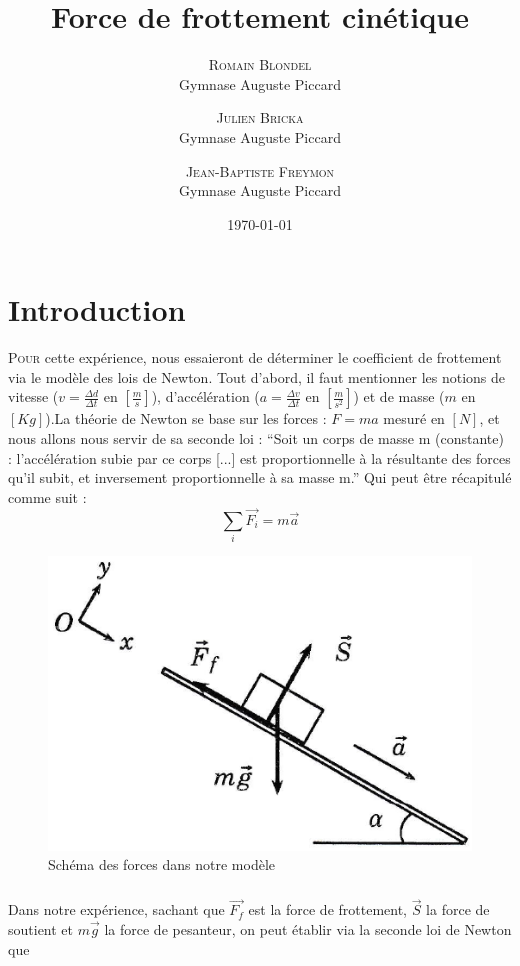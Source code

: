 \documentclass[twoside,twocolumn]{article}
\title{Force de frottement cinétique} %
\author{%
\textsc{Romain Blondel} \\[1ex] %
\normalsize Gymnase Auguste Piccard \\
\and %
\textsc{Julien Bricka} \\[1ex]
\normalsize Gymnase Auguste Piccard \\ %
\and %
\textsc{Jean-Baptiste Freymon} \\[1ex] %
\normalsize Gymnase Auguste Piccard \\ %
}
\date{\today} %
\begin{document}
\maketitle


\section{Introduction}
\lettrine[nindent=0em,lines=3]{P}{our} cette expérience, nous essaieront de déterminer le coefficient de frottement via le modèle des lois de Newton. Tout d'abord, il faut mentionner les notions de vitesse ($v = \frac{\Delta d}{\Delta t}$ en $\left[ \frac{m}{s} \right]$), d'accélération ($a = \frac{\Delta v}{\Delta t}$ en $\left[ \frac{m}{s^2} \right]$) et de masse ($m$ en $[Kg]$).La théorie de Newton se base sur les forces : $F = ma$ mesuré en $[N]$, et nous allons nous servir de sa seconde loi : \enquote{Soit un corps de masse m (constante) : l'accélération subie par ce corps [...] est proportionnelle à la résultante des forces qu'il subit, et inversement proportionnelle à sa masse m.} Qui peut être récapitulé comme suit :
$$ \sum_{i} \vec{F_i} = m \vec{a} $$
\begin{figure}[H]
\centering
\includegraphics[scale=0.5]{schem_intro.png}
\caption{Schéma des forces dans notre modèle}
\end{figure}
\subparagraph*{}
Dans notre expérience, sachant que $\vec{F_f}$ est la force de frottement, $\vec{S} $ la force de soutient et $ m \vec{g}$ la force de pesanteur, on peut établir via la seconde loi de Newton que 
\end{document}
